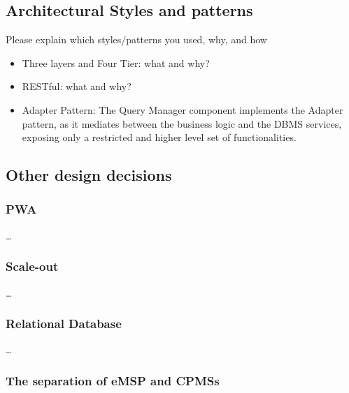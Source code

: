\subsection{Architectural Styles and patterns}
Please explain which styles/patterns you used, why, and how

\begin{itemize}
    \item Three layers and Four Tier: what and why?
    \item RESTful: what and why?
    \item Adapter Pattern: The Query Manager component implements the Adapter pattern, as it mediates between the
          business logic and the DBMS services, exposing only a restricted and higher level set of functionalities.
\end{itemize}
\subsection{Other design decisions}
\subsubsection{PWA}
\dots
\subsubsection{Scale-out}
\dots
\subsubsection{Relational Database}
\dots
\subsubsection{The separation of eMSP and CPMSs}